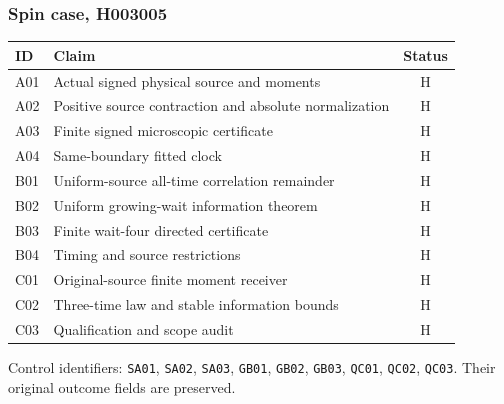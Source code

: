 \subsubsection{Spin case, H003005}
\begin{center}\small\begin{tabular}{lp{2.15in}c}\toprule ID&Claim&Status\\\midrule
A01&Actual signed physical source and moments&H\\
A02&Positive source contraction and absolute normalization&H\\
A03&Finite signed microscopic certificate&H\\
A04&Same-boundary fitted clock&H\\
B01&Uniform-source all-time correlation remainder&H\\
B02&Uniform growing-wait information theorem&H\\
B03&Finite wait-four directed certificate&H\\
B04&Timing and source restrictions&H\\
C01&Original-source finite moment receiver&H\\
C02&Three-time law and stable information bounds&H\\
C03&Qualification and scope audit&H\\
\bottomrule\end{tabular}\end{center}
Control identifiers: \texttt{SA01}, \texttt{SA02}, \texttt{SA03}, \texttt{GB01}, \texttt{GB02}, \texttt{GB03}, \texttt{QC01}, \texttt{QC02}, \texttt{QC03}. Their original outcome fields are preserved.
